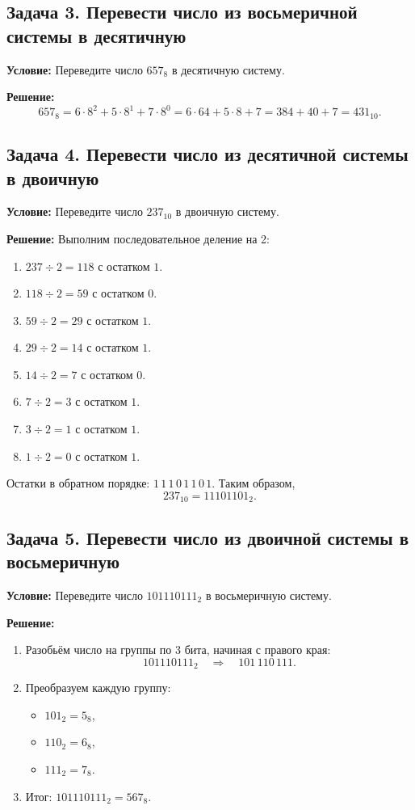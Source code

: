 \documentclass[12pt,a4paper]{article}
\begin{document}
\subsection{Задача 3. Перевести число из восьмеричной системы в десятичную}
\textbf{Условие:} Переведите число \(657_8\) в десятичную систему.

\textbf{Решение:}
\[
657_8 = 6\cdot8^2 + 5\cdot8^1 + 7\cdot8^0 = 6\cdot64 + 5\cdot8 + 7 = 384 + 40 + 7 = 431_{10}.
\]

\subsection{Задача 4. Перевести число из десятичной системы в двоичную}
\textbf{Условие:} Переведите число \(237_{10}\) в двоичную систему.

\textbf{Решение:} Выполним последовательное деление на 2:
\begin{enumerate}
    \item \(237 \div 2 = 118\) с остатком \(1\).
    \item \(118 \div 2 = 59\) с остатком \(0\).
    \item \(59 \div 2 = 29\) с остатком \(1\).
    \item \(29 \div 2 = 14\) с остатком \(1\).
    \item \(14 \div 2 = 7\) с остатком \(0\).
    \item \(7 \div 2 = 3\) с остатком \(1\).
    \item \(3 \div 2 = 1\) с остатком \(1\).
    \item \(1 \div 2 = 0\) с остатком \(1\).
\end{enumerate}
Остатки в обратном порядке: \(1\,1\,1\,0\,1\,1\,0\,1\). Таким образом,
\[
237_{10} = 11101101_2.
\]

\subsection{Задача 5. Перевести число из двоичной системы в восьмеричную}
\textbf{Условие:} Переведите число \(101110111_2\) в восьмеричную систему.

\textbf{Решение:}
\begin{enumerate}
    \item Разобьём число на группы по 3 бита, начиная с правого края:
    \[
    101110111_2 \quad \Rightarrow \quad 101\,110\,111.
    \]
    \item Преобразуем каждую группу:
    \begin{itemize}
        \item \(101_2 = 5_8\),
        \item \(110_2 = 6_8\),
        \item \(111_2 = 7_8\).
    \end{itemize}
    \item Итог: \(101110111_2 = 567_8\).
\end{enumerate}
\end{document}
